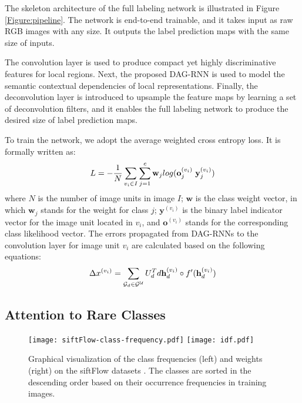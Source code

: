 \documentclass[10pt,twocolumn,letterpaper]{article}
\newcommand \hh {\mathbf{h}}
\newcommand \oo {\mathbf{o}}
\begin{document}
The skeleton architecture of the full labeling network is illustrated in Figure \ref{Figure:pipeline}. The network is end-to-end trainable, and it takes input as raw RGB images with any size. It outputs the label prediction maps with the same size of inputs.



The convolution layer is used to produce compact yet highly discriminative features for local regions.
Next, the proposed DAG-RNN is used to model the semantic contextual dependencies of local representations.
Finally, the deconvolution layer \cite{long2015fully} is introduced to upsample the feature maps by learning a set of deconvolution filters, and it enables the full labeling network to produce the desired size of label prediction maps.

To train the network, we adopt the average weighted cross entropy loss. It is formally written as:
\begin{equation}
\small
L = -\frac{1}{N}\sum_{v_i \in I}\sum_{j=1}^{c} \mathbf{w}_j log (\oo^{(v_i)}_j  \ \mathbf{y}^{(v_i)}_j)
\end{equation}
where $N$ is the number of image units in image $I$; {$\mathbf{w}$ is the class weight vector}, in which $\mathbf{w}_j$ stands for the weight for class $j$; $\mathbf{y}^{(v_i)}$ is the binary label indicator vector for the image unit located in $v_i$, and $\oo^{(v_i)}$  stands for the corresponding class likelihood vector. The errors propagated from DAG-RNNs to the convolution layer for image unit $v_i$ are calculated based on the following equations:
\begin{equation}
\small
\Delta x^{(v_i)} =  \sum_{\mathcal{G}_d \in \mathcal{G}^{\mathcal{U}}} U_d^T d\hh_d^{(v_i)} \circ f'(\hh_d^{(v_i)})
\end{equation}


\subsection{Attention to Rare Classes}
\begin{figure}
\begin{center}
  \texttt{[image: siftFlow-class-frequency.pdf]}
  \hspace{-0.5em}
  \texttt{[image: idf.pdf]}
\end{center}
\caption{Graphical visualization of the class frequencies (left) and weights (right) on the siftFlow datasets \cite{liu2009nonparametric}. The classes are sorted in the descending order based on their occurrence frequencies in training images.}
  \label{Figure:idf}
\end{figure}
\end{document}

